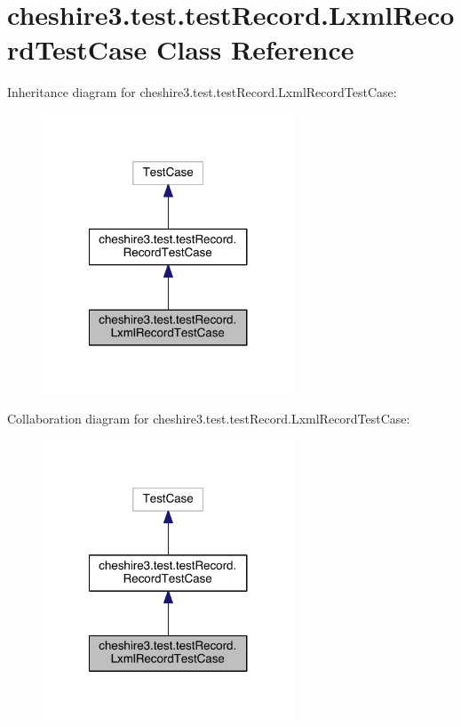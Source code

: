\hypertarget{classcheshire3_1_1test_1_1test_record_1_1_lxml_record_test_case}{\section{cheshire3.\-test.\-test\-Record.\-Lxml\-Record\-Test\-Case Class Reference}
\label{classcheshire3_1_1test_1_1test_record_1_1_lxml_record_test_case}
}


Inheritance diagram for cheshire3.\-test.\-test\-Record.\-Lxml\-Record\-Test\-Case\-:
\nopagebreak
\begin{figure}[H]
\begin{center}
\leavevmode
\includegraphics[width=212pt]{classcheshire3_1_1test_1_1test_record_1_1_lxml_record_test_case__inherit__graph}
\end{center}
\end{figure}


Collaboration diagram for cheshire3.\-test.\-test\-Record.\-Lxml\-Record\-Test\-Case\-:
\nopagebreak
\begin{figure}[H]
\begin{center}
\leavevmode
\includegraphics[width=212pt]{classcheshire3_1_1test_1_1test_record_1_1_lxml_record_test_case__coll__graph}
\end{center}
\end{figure}
